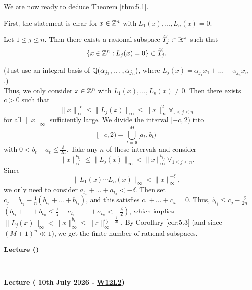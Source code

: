 \documentclass{Vorlesungstemplate_English} %
\begin{document}
\noindent We are now ready to deduce Theorem \ref{thm:5.1}.
\begin{pf}
  First, the statement is clear for $x \in \mathbb{Z}^n$ with $L_1(x), \dots, L_n(x) = 0$.
  \begin{exercise}{}{}
    Let $1 \leq j \leq n$. Then there exists a rational subspace $\widetilde{T}_j \subset \mathbb{R}^n$ such that
    \[ \{ x \in \mathbb{Z}^n: L_j(x) = 0\} \subset \widetilde{T}_j.\]
  \end{exercise}
  (Just use an integral basis of $\mathbb{Q}(\alpha_{j_1}, \dots, \alpha_{j_n})$, where $L_j(x) = \alpha_{j_1}x_1 + \dots + \alpha_{j_n}x_n$.) \\
  Thus, we only consider $x \in \mathbb{Z}^n$ with $L_1(x), \dots, L_n(x) \neq 0$. Then there exists $c > 0$ such that
  \[ \|x\|_{\infty}^{-c} \leq \| L_j(x)\|_{\infty} \leq \|x\|_{\infty}^2 \forall_{1 \leq j \leq n}\]
  for all $\|x\|_{\infty}$ sufficiently large. We divide the interval $[-c, 2)$ into
  \[ [-c, 2) = \bigcup_{t=0}^M [a_t, b_t)\]
  with $0 < b_t-a_t \leq \frac{\delta}{2n}$. Take any $n$ of these intervals and consider
  \[ \|x\|_{\infty}^{a_{t_j}} \leq \|L_j(x)\|_{\infty} < \|x\|_{\infty}^{b_{t_j}} \forall_{1 \leq j \leq n}.\]
  Since
  \[ \|L_1(x)\cdots L_n(x)\|_{\infty} < \|x\|_{\infty}^{-\delta},\]
  we only need to consider $a_{t_1}+\dots+a_{t_n} < - \delta$. Then set $c_j = b_{t_j} - \frac{1}{n}(b_{t_1}+ \dots + b_{t_n})$, and this satisfies $c_1+\dots+c_n = 0$. Thus, $b_{t_j} \leq c_j - \frac{\delta}{2n}$ {\color{blue} $\left(b_{t_1} + \dots + b_{t_n} \leq \frac{\delta}{2} + a_{t_1} + \dots + a_{t_n} < - \frac{\delta}{2}\right)$}, which implies $\|L_j(x)\|_{\infty} < \|x\|_{\infty}^{b_{t_j}} \leq \|x\|_{\infty}^{c_j-\frac{\delta}{2n}}$. By Corollary \ref{cor:5.3} (and since $(M+1)^n \ll 1$), we get the finite number of rational subspaces.
\end{pf}
\renewcommand{\lastLectureDate}{\currentLectureDate}
\ifnum{}
\else
\begin{center}
  \textbf{Lecture \thelecture{} (\lastLectureDate)}
\end{center}
\vspace{-0.6cm}
\fi
\addtocounter{lecture}{1}
\ifnum{}
\else
\noindent \dotfill \\
\fi
\renewcommand{\currentLectureDate}{{\color{orange} 10th July 2026 - \href{https://ecampus.uni-bonn.de/ilias.php?baseClass=ilrepositorygui&cmd=sendfile&ref_id=4213277}{W12L2}}}
\ifnum{}
\else
\vspace*{-0.8cm}
\begin{center}
  \color{orange} \textbf{Lecture \thelecture{} (\currentLectureDate)}
\end{center}
\end{document}
